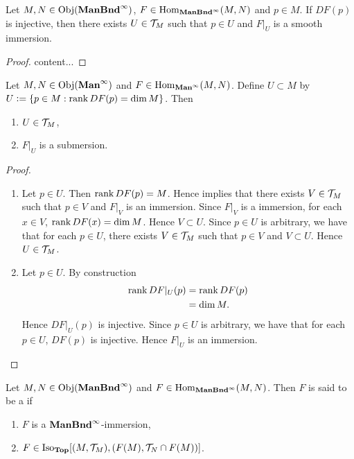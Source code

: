 \documentclass{book}
\begin{document}
	\begin{ex} 
		Let $M, N \in \operatorname{Obj}(\operatorname*{\text{\textbf{ManBnd}}^{\infty}})$, $F \in \operatorname{Hom}_{\operatorname*{\text{\textbf{ManBnd}}^{\infty}}}(M, N)$ and $p \in M$. If $DF(p)$ is injective, then there exists $U \in \mathcal{T}_M$ such that $p \in U$ and $F|_U$ is a smooth immersion.
	\end{ex}

	\begin{proof}
		content...
	\end{proof}

	\begin{ex} 
		Let $M, N \in \operatorname{Obj}(\operatorname*{\text{\textbf{Man}}^{\infty}})$ and $F \in \operatorname{Hom}_{\operatorname*{\text{\textbf{Man}}^{\infty}}}(M,N)$. Define $U \subset M$ by $U \vcentcolon= \{p \in M: \operatorname{\text{rank}} DF(p) = \dim M\}$. Then 
		\begin{enumerate}
			\item $U \in \mathcal{T}_M$,
			\item $F|_U$ is a submersion.
		\end{enumerate}
	\end{ex}
	
	\begin{proof}
		\begin{enumerate}
			\item Let $p \in U$. Then $\operatorname{\text{rank}} DF(p) = M$. Hence  implies that there exists $V \in \mathcal{T}_M$ such that $p \in V$ and $F|_V$ is an immersion. Since $F|_V$ is a immersion, for each $x \in V$, $\operatorname{\text{rank}} DF(x) = \dim M$. Hence $V \subset U$. Since $p \in U$ is arbitrary, we have that for each $p \in U$, there exists $V \in \mathcal{T}_M$ such that $p \in V$ and $V \subset U$. Hence $U \in \mathcal{T}_M$.
			\item Let $p \in U$. By construction  
			\begin{align*}
				\operatorname{\text{rank}} DF|_U(p)
				& = \operatorname{\text{rank}} DF(p) \\ 
				& = \dim M.
			\end{align*}
			Hence $DF|_U(p)$ is injective. Since $p \in U$ is arbitrary, we have that for each $p \in U$, $DF(p)$ is injective. Hence $F|_U$ is an immersion.
		\end{enumerate}
	\end{proof}
	
	\begin{defn}  
		Let $M, N \in \operatorname{Obj}(\operatorname*{\text{\textbf{ManBnd}}^{\infty}})$ and $F \in \operatorname{Hom}_{\operatorname*{\text{\textbf{ManBnd}}^{\infty}}}(M, N)$. Then $F$ is said to be a  if 
		\begin{enumerate}
			\item $F$ is a $\operatorname*{\text{\textbf{ManBnd}}^{\infty}}$-immersion, 
			\item $F \in \operatorname{Iso}_{\operatorname*{\text{\textbf{Top}}}}[(M, \mathcal{T}_M), (F(M), \mathcal{T}_N \cap F(M))]$.
		\end{enumerate}	 
	\end{defn}	
\end{document}

